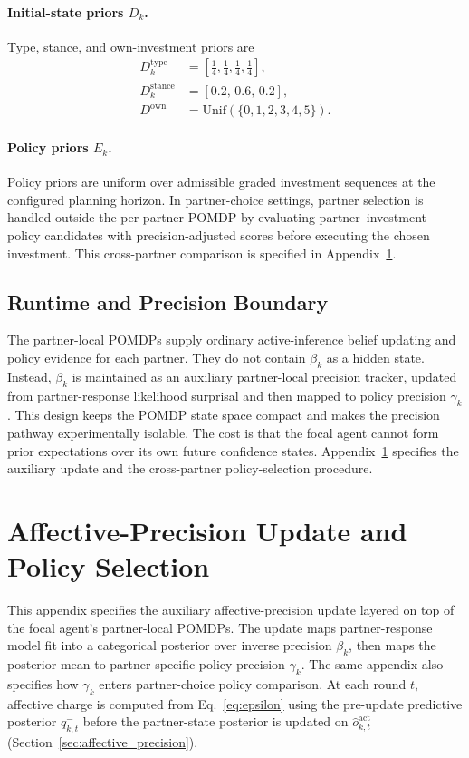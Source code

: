 \documentclass[runningheads,orivec]{llncs}
\begin{document}
\paragraph{Initial-state priors \(D_k\).}
Type, stance, and own-investment priors are
\begin{align}
D_k^{\mathrm{type}} &= \left[\tfrac{1}{4},\tfrac{1}{4},\tfrac{1}{4},\tfrac{1}{4}\right], \label{eq:d_type}\\
D_k^{\mathrm{stance}} &= [0.2,\,0.6,\,0.2], \label{eq:d_stance}\\
D^{\mathrm{own}} &= \mathrm{Unif}(\{0,1,2,3,4,5\}). \label{eq:d_own}
\end{align}

\paragraph{Policy priors \(E_k\).}
Policy priors are uniform over admissible graded investment sequences at the configured planning horizon. In partner-choice settings, partner selection is handled outside the per-partner POMDP by evaluating partner--investment policy candidates with precision-adjusted scores before executing the chosen investment. This cross-partner comparison is specified in Appendix~\ref{app:affective_update}.

\subsection{Runtime and Precision Boundary}
\label{app:pomdp_beta_auxiliary}

The partner-local POMDPs supply ordinary active-inference belief updating and policy evidence for each partner. They do not contain \(\beta_k\) as a hidden state. Instead, \(\beta_k\) is maintained as an auxiliary partner-local precision tracker, updated from partner-response likelihood surprisal and then mapped to policy precision \(\gamma_k\). This design keeps the POMDP state space compact and makes the precision pathway experimentally isolable. The cost is that the focal agent cannot form prior expectations over its own future confidence states. Appendix~\ref{app:affective_update} specifies the auxiliary update and the cross-partner policy-selection procedure.
\section{Affective-Precision Update and Policy Selection}
\label{app:affective_update}

This appendix specifies the auxiliary affective-precision update layered on top of the focal agent's partner-local POMDPs. The update maps partner-response model fit into a categorical posterior over inverse precision \(\beta_k\), then maps the posterior mean to partner-specific policy precision \(\gamma_k\). The same appendix also specifies how \(\gamma_k\) enters partner-choice policy comparison. At each round \(t\), affective charge is computed from Eq.~\eqref{eq:epsilon} using the pre-update predictive posterior \(q_{k,t}^-\) before the partner-state posterior is updated on \(\hat{o}_{k,t}^{\text{act}}\) (Section~\ref{sec:affective_precision}).
\end{document}
